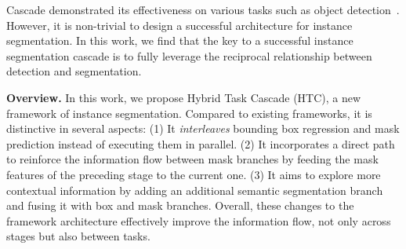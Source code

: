 \documentclass[10pt,twocolumn,letterpaper]{article}
\begin{document}

Cascade demonstrated its effectiveness on various tasks such as object
detection~\cite{cai18cascadercnn}. However, it is non-trivial to design a
successful architecture for instance segmentation.
In this work, we find that the key to a successful instance segmentation
cascade is to fully leverage the reciprocal relationship between detection
and segmentation.

\vspace{2pt}
\noindent
\textbf{Overview.}
In this work, we propose Hybrid Task Cascade (HTC), a new framework of
instance segmentation. Compared to existing frameworks, it is distinctive
in several aspects:
(1) It \emph{interleaves} bounding box regression and mask prediction
instead of executing them in parallel.
(2) It incorporates a direct path to reinforce the information flow
between mask branches by feeding the mask features of the preceding
stage to the current one.
(3) It aims to explore more contextual information by adding an additional
semantic segmentation branch and fusing it with box and mask branches.
Overall, these changes to the framework architecture effectively improve
the information flow, not only across stages but also between tasks.
\end{document}

